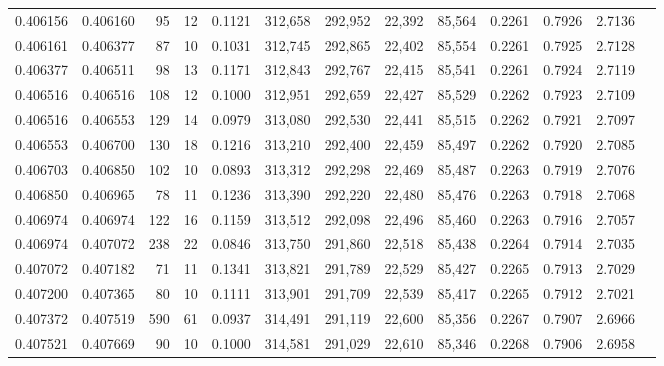 \begin{tabular}{rrrrrrrrrrrrr}
0.406156 & 0.406160 &    95 &  12 &                                     0.1121 & 312,658 & 292,952 &  22,392 &  85,564 & 0.2261 & 0.7926 & 2.7136 \\
0.406161 & 0.406377 &    87 &  10 &                                     0.1031 & 312,745 & 292,865 &  22,402 &  85,554 & 0.2261 & 0.7925 & 2.7128 \\
0.406377 & 0.406511 &    98 &  13 &                                     0.1171 & 312,843 & 292,767 &  22,415 &  85,541 & 0.2261 & 0.7924 & 2.7119 \\
0.406516 & 0.406516 &   108 &  12 &                                     0.1000 & 312,951 & 292,659 &  22,427 &  85,529 & 0.2262 & 0.7923 & 2.7109 \\
0.406516 & 0.406553 &   129 &  14 &                                     0.0979 & 313,080 & 292,530 &  22,441 &  85,515 & 0.2262 & 0.7921 & 2.7097 \\
0.406553 & 0.406700 &   130 &  18 &                                     0.1216 & 313,210 & 292,400 &  22,459 &  85,497 & 0.2262 & 0.7920 & 2.7085 \\
0.406703 & 0.406850 &   102 &  10 &                                     0.0893 & 313,312 & 292,298 &  22,469 &  85,487 & 0.2263 & 0.7919 & 2.7076 \\
0.406850 & 0.406965 &    78 &  11 &                                     0.1236 & 313,390 & 292,220 &  22,480 &  85,476 & 0.2263 & 0.7918 & 2.7068 \\
0.406974 & 0.406974 &   122 &  16 &                                     0.1159 & 313,512 & 292,098 &  22,496 &  85,460 & 0.2263 & 0.7916 & 2.7057 \\
0.406974 & 0.407072 &   238 &  22 &                                     0.0846 & 313,750 & 291,860 &  22,518 &  85,438 & 0.2264 & 0.7914 & 2.7035 \\
0.407072 & 0.407182 &    71 &  11 &                                     0.1341 & 313,821 & 291,789 &  22,529 &  85,427 & 0.2265 & 0.7913 & 2.7029 \\
0.407200 & 0.407365 &    80 &  10 &                                     0.1111 & 313,901 & 291,709 &  22,539 &  85,417 & 0.2265 & 0.7912 & 2.7021 \\
0.407372 & 0.407519 &   590 &  61 &                                     0.0937 & 314,491 & 291,119 &  22,600 &  85,356 & 0.2267 & 0.7907 & 2.6966 \\
0.407521 & 0.407669 &    90 &  10 &                                     0.1000 & 314,581 & 291,029 &  22,610 &  85,346 & 0.2268 & 0.7906 & 2.6958 \\

\end{tabular}
